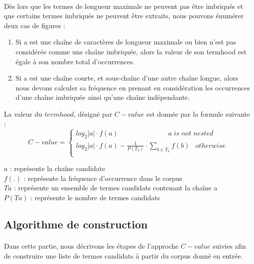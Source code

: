 \documentclass[12pt, a4paper, oneside]{book}
\begin{document}
\paragraph{}
Dès lors que les termes de longueur maximale ne peuvent pas être imbriqués et que certains termes imbriqués ne peuvent être extraits, nous pouvons énumérer deux cas de figures : 

\begin{enumerate}

\item Si a est une chaîne de caractères de longueur maximale ou bien n'est pas considérée comme une chaîne imbriquée, alors la valeur de son termhood est égale à son nombre total d'occurrences.
\item Si a est une chaîne courte, et sous-chaîne d'une autre chaîne longue, alors nous devons calculer sa fréquence en prenant en considération les occurrences d'une chaîne imbriquée ainsi qu'une chaîne indépendante.

\end{enumerate}

La valeur du $termhood$, désigné par $C-value$ est donnée par la formule suivante :
\begin{equation}
C-value = \left\{
  \begin{array}{rcr}
    log_2\vert a \vert \cdot f(a)  \;\;\;\;\;\;\;\;\;\;\;\;\;\;\;\;\;\;\;\;\;\;\;\;\;  \; a \; is \; not \; nested  \\
    log_2\vert a \vert \cdot f(a) - \frac{1}{P(T_a)} \cdot \sum_{b \in T_a} f(b) \;\;\; otherwise \\
  \end{array}
\right.
\end{equation}



$a$ : représente la chaîne candidate\\
$f(.)$ : représente la fréquence d'occurrence dans le corpus\\
$Ta$ : représente un ensemble de termes candidats contenant la chaîne a\\
$P(Ta)$ : représente le nombre de termes candidats\\




\subsection{Algorithme de construction}
\paragraph{}
Dans cette partie, nous décrivons les étapes de l'approche $C-value$ suivies afin de construire une liste de termes candidats à partir du corpus donné en entrée.
\end{document}
